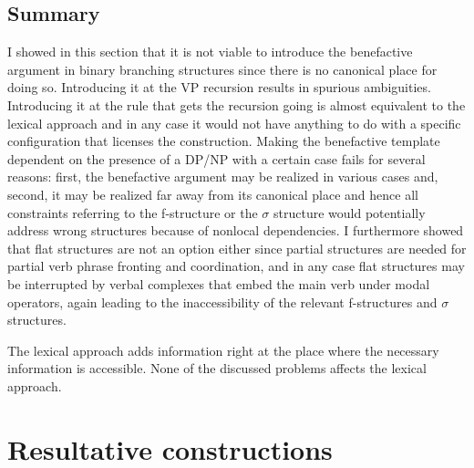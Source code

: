 \subsection{Summary}

I showed in this section that it is not viable to introduce the benefactive argument in binary
branching structures since there is no canonical place for doing so. Introducing it at the VP
recursion results in spurious ambiguities. Introducing it at the rule that gets the recursion going
is almost equivalent to the lexical approach and in any case it would not have anything to do with a
specific configuration that licenses the construction. Making the benefactive template dependent on
the presence of a DP/NP with a certain case fails for several reasons: first, the benefactive
argument may be realized in various cases and, second, it may be realized far away from its canonical
place and hence all constraints referring to the f-structure or the $\sigma$ structure would
potentially address wrong structures because of nonlocal dependencies. I furthermore showed that
flat structures are not an option either since partial structures are needed for partial verb phrase
fronting and coordination, and in any case flat structures may be interrupted by verbal complexes
that embed the main verb under modal operators, again leading to the inaccessibility of the relevant
f-structures and $\sigma$ structures.

The lexical approach adds information right at the place where the necessary information is
accessible. None of the discussed problems affects the lexical approach.


\section{Resultative constructions}


